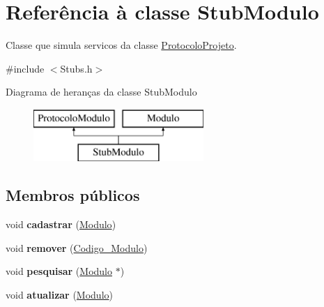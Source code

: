 \hypertarget{class_stub_modulo}{
\section{\-Referência à classe \-Stub\-Modulo}
\label{class_stub_modulo}
}


\-Classe que simula servicos da classe \hyperlink{class_protocolo_projeto}{\-Protocolo\-Projeto}.  




{\ttfamily \#include $<$\-Stubs.\-h$>$}

\-Diagrama de heranças da classe \-Stub\-Modulo\begin{figure}[H]
\begin{center}
\leavevmode
\includegraphics[height=2.000000cm]{class_stub_modulo}
\end{center}
\end{figure}
\subsection*{\-Membros públicos}
\begin{DoxyCompactItemize}
\item 
\hypertarget{class_stub_modulo_ad3ee153e45f91a9000ea12064d876528}{
void {\bfseries cadastrar} (\hyperlink{class_modulo}{\-Modulo})}
\label{class_stub_modulo_ad3ee153e45f91a9000ea12064d876528}

\item 
\hypertarget{class_stub_modulo_a8bb3265b52dca8f8358917b8eb5f3009}{
void {\bfseries remover} (\hyperlink{class_codigo___modulo}{\-Codigo\-\_\-\-Modulo})}
\label{class_stub_modulo_a8bb3265b52dca8f8358917b8eb5f3009}

\item 
\hypertarget{class_stub_modulo_a68c0ce9a1a91220283cdb568241bba8c}{
void {\bfseries pesquisar} (\hyperlink{class_modulo}{\-Modulo} $\ast$)}
\label{class_stub_modulo_a68c0ce9a1a91220283cdb568241bba8c}

\item 
\hypertarget{class_stub_modulo_a4997adf1d294eef4a3bd955a4d51cf9a}{
void {\bfseries atualizar} (\hyperlink{class_modulo}{\-Modulo})}
\label{class_stub_modulo_a4997adf1d294eef4a3bd955a4d51cf9a}

\end{DoxyCompactItemize}
